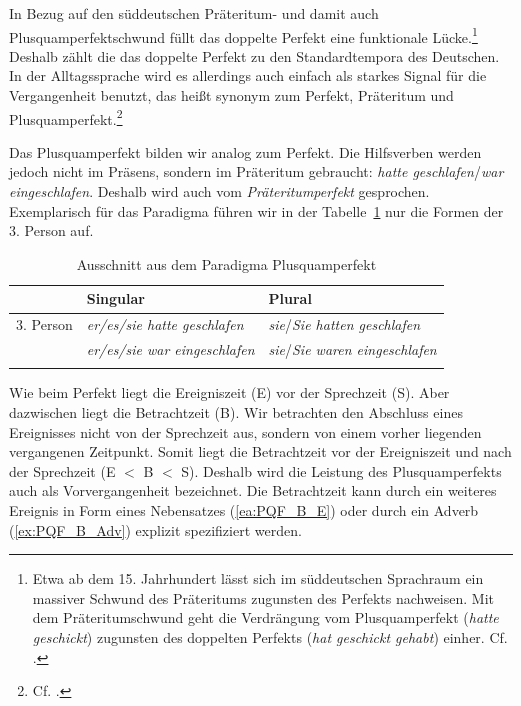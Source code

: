 In Bezug auf den süddeutschen Präteritum- und damit auch Plusquamperfektschwund füllt das doppelte Perfekt eine funktionale Lücke.\footnote{Etwa ab dem 15. Jahrhundert lässt sich im süddeutschen Sprachraum ein massiver Schwund des Präteritums zugunsten des Perfekts nachweisen. Mit dem Präteritumschwund geht die Verdrängung vom Plusquamperfekt (\textit{hatte geschickt}) zugunsten des doppelten Perfekts (\textit{hat geschickt gehabt}) einher. Cf. \citep[272]{Behaghel1924}.} Deshalb zählt die \citet[219, §326]{Duden2022} das doppelte Perfekt zu den Standardtempora des Deutschen. In der Alltagssprache wird es allerdings auch einfach als starkes Signal für die Vergangenheit benutzt, das heißt synonym zum Perfekt, Präteritum und Plusquamperfekt.\footnote{Cf. \citet[88]{Hennig2000}.}


\label{subsubsubsection:PQF}

Das Plusquamperfekt bilden wir analog zum Perfekt. Die Hilfsverben werden jedoch nicht im Präsens, sondern im Präteritum gebraucht: \textit{hatte geschlafen}/\textit{war eingeschlafen}. Deshalb wird auch vom \textit{Präteritumperfekt} gesprochen. Exemplarisch für das Paradigma führen wir in der Tabelle~\ref{tab:PQF} nur die Formen der 3. Person auf.

\begin{table}
  \centering
  \begin{tabular}{l l l}
    \lsptoprule
    & Singular & Plural \\
    \hline
    3. Person & \textit{er/es/sie hatte geschlafen} & \textit{sie}/\textit{Sie hatten geschlafen} \\
    
    & \textit{er/es/sie war eingeschlafen} & \textit{sie}/\textit{Sie waren eingeschlafen} \\
    \lspbottomrule 
  \end{tabular}
  \caption{Ausschnitt aus dem Paradigma Plusquamperfekt}
  \label{tab:PQF}
\end{table}

Wie beim Perfekt liegt die Ereigniszeit (E) vor der Sprechzeit (S). Aber dazwischen liegt die Betrachtzeit (B). Wir betrachten den Abschluss eines Ereignisses nicht von der Sprechzeit aus, sondern von einem vorher liegenden vergangenen Zeitpunkt. Somit liegt die Betrachtzeit vor der Ereigniszeit und nach der Sprechzeit (E $<$ B $<$ S). Deshalb wird die Leistung des Plusquamperfekts auch als Vorvergangenheit bezeichnet. Die Betrachtzeit kann durch ein weiteres Ereignis in Form eines Nebensatzes (\ref{ea:PQF_B_E}) oder durch ein Adverb (\ref{ex:PQF_B_Adv}) explizit spezifiziert werden.

